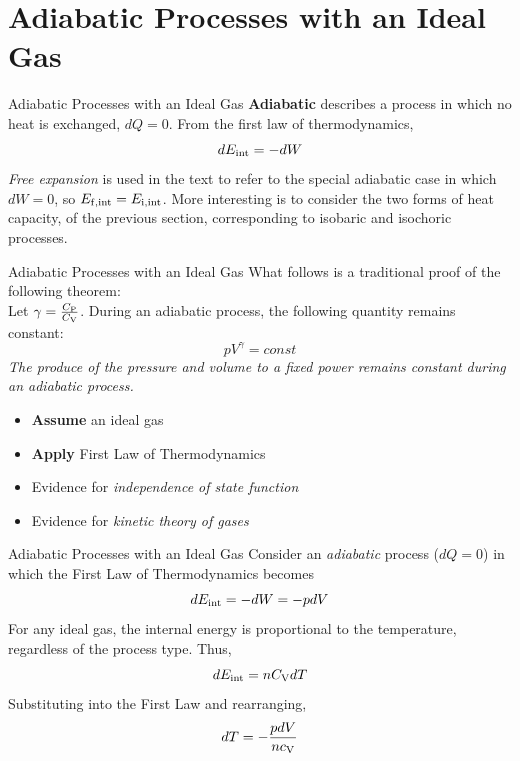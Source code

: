 \documentclass{beamer}
\begin{document}
\section{Adiabatic Processes with an Ideal Gas}

\begin{frame}{Adiabatic Processes with an Ideal Gas}
\textbf{\alert{Adiabatic}} describes a process in which no heat is exchanged, $dQ = 0$.  From the first law of thermodynamics,
\begin{equation}
dE_{\rm int} = -dW
\end{equation}
\textit{Free expansion} is used in the text to refer to the special adiabatic case in which $dW = 0$, so $E_{\rm f,int} = E_{\rm i,int}$.  More interesting is to consider the two forms of heat capacity, of the previous section, corresponding to isobaric and isochoric processes.
\end{frame}

\begin{frame}{Adiabatic Processes with an Ideal Gas}
\small What follows is a traditional proof of the following theorem: \\ \vspace{0.5cm}
Let $\gamma = \frac{C_{\rm P}}{C_{\rm V}}$.  During an adiabatic process, the following quantity remains constant:
\begin{equation}
pV^{\gamma} = const
\end{equation}
\textit{The produce of the pressure and volume to a fixed power remains constant during an adiabatic process.} \\ \vspace{0.5cm}
\begin{itemize}
\item \textbf{Assume} an ideal gas
\item \textbf{Apply} First Law of Thermodynamics
\item Evidence for \textit{independence of state function}
\item Evidence for \textit{kinetic theory of gases}
\end{itemize}
\end{frame}

\begin{frame}{Adiabatic Processes with an Ideal Gas}
Consider an \textit{adiabatic} process ($dQ=0$) in which the First Law of Thermodynamics becomes
\begin{equation}
dE_{\rm int} = -dW = -pdV
\end{equation}
For any ideal gas, the internal energy is proportional to the temperature, regardless of the process type.  Thus,
\begin{equation}
dE_{\rm int} = n C_{\rm V} dT
\end{equation}
Substituting into the First Law and rearranging,
\begin{equation}
dT = -\frac{pdV}{n c_{\rm V}} \label{eq:t1}
\end{equation}
\end{frame}
\end{document}
